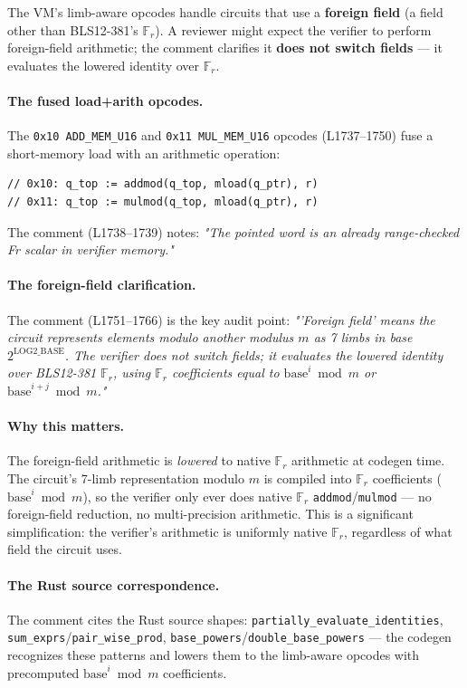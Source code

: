 The VM's limb-aware opcodes handle circuits that use a
\textbf{foreign field} (a field other than BLS12-381's $\mathbb{F}_r$).
A reviewer might expect the verifier to perform foreign-field
arithmetic; the comment clarifies it \textbf{does not switch
fields} --- it evaluates the lowered identity over
$\mathbb{F}_r$.

\paragraph{The fused load+arith opcodes.} The
\texttt{0x10 ADD\_\allowbreak{}MEM\_\allowbreak{}U16} and \texttt{0x11 MUL\_\allowbreak{}MEM\_\allowbreak{}U16}
opcodes (L1737--1750) fuse a short-memory load with an
arithmetic operation:
\begin{lstlisting}[style=yul]
// 0x10: q_top := addmod(q_top, mload(q_ptr), r)
// 0x11: q_top := mulmod(q_top, mload(q_ptr), r)
\end{lstlisting}
The comment (L1738--1739) notes: \emph{"The pointed word is an
already range-checked Fr scalar in verifier memory."}

\paragraph{The foreign-field clarification.} The comment
(L1751--1766) is the key audit point: \emph{"'Foreign field'
means the circuit represents elements modulo another modulus $m$
as 7 limbs in base $2^{\text{LOG2\_BASE}}$. The verifier does not
switch fields; it evaluates the lowered identity over BLS12-381
$\mathbb{F}_r$, using $\mathbb{F}_r$ coefficients equal to
$\text{base}^i \bmod m$ or $\text{base}^{i+j} \bmod m$."}

\paragraph{Why this matters.} The foreign-field arithmetic is
\emph{lowered} to native $\mathbb{F}_r$ arithmetic at codegen
time. The circuit's 7-limb representation modulo $m$ is compiled
into $\mathbb{F}_r$ coefficients ($\text{base}^i \bmod m$), so
the verifier only ever does native $\mathbb{F}_r$
\texttt{addmod}/\texttt{mulmod} --- no foreign-field reduction,
no multi-precision arithmetic. This is a significant
simplification: the verifier's arithmetic is uniformly native
$\mathbb{F}_r$, regardless of what field the circuit uses.

\paragraph{The Rust source correspondence.} The comment cites the
Rust source shapes:
\texttt{partially\_\allowbreak{}evaluate\_\allowbreak{}identities},
\texttt{sum\_exprs}/\texttt{pair\_wise\_prod},
\texttt{base\_powers}/\texttt{double\_\allowbreak{}base\_\allowbreak{}powers} --- the
codegen recognizes these patterns and lowers them to the
limb-aware opcodes with precomputed $\text{base}^i \bmod m$
coefficients.

